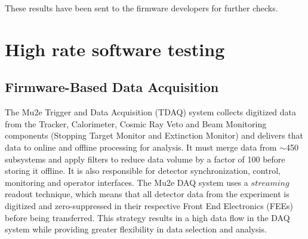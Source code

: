 These results have been sent to the firmware developers for further checks.

















\iffalse


\section{High rate software testing}
\subsection{Firmware-Based Data Acquisition}
The Mu2e Trigger and Data Acquisition (TDAQ) system collects digitized data from the Tracker, 
Calorimeter, Cosmic Ray Veto and Beam Monitoring components (Stopping Target Monitor and Extinction Monitor) 
and delivers that data to online and offline processing for analysis. It must merge data from $\sim$450 subsystems 
and apply filters to reduce data volume by a factor of 100 before storing it offline. It is also responsible for 
detector synchronization, control, monitoring and operator interfaces. The Mu2e DAQ system uses a $streaming$ readout technique, 
which means that all detector data from the experiment is digitized and zero-suppressed in their respective Front End Electronics 
(FEEs) before being transferred. This strategy results in a high data flow in the DAQ system while providing greater flexibility in data selection and analysis.
